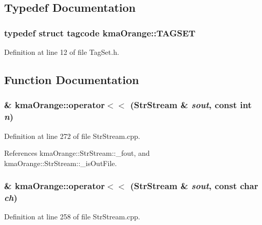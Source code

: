 \subsection{Typedef Documentation}
\hypertarget{namespacekmaOrange_230797a4305d0e6ffe336733f420995a}{
\subsubsection[{TAGSET}]{\setlength{\rightskip}{0pt plus 5cm}typedef struct {\bf tagcode} {\bf kmaOrange::TAGSET}}}
\label{namespacekmaOrange_230797a4305d0e6ffe336733f420995a}




Definition at line 12 of file TagSet.h.

\subsection{Function Documentation}
\hypertarget{namespacekmaOrange_008d16bca4a1401a4a101eef0ca283a1}{
\subsubsection[{operator$<$$<$}]{\& kmaOrange::operator$<$$<$ ({\bf StrStream} \& {\em sout}, \/  const int {\em n})}}
\label{namespacekmaOrange_008d16bca4a1401a4a101eef0ca283a1}




Definition at line 272 of file StrStream.cpp.

References kmaOrange::StrStream::\_\-fout, and kmaOrange::StrStream::\_\-isOutFile.\hypertarget{namespacekmaOrange_3ef646cb3fe8b1b3f864a03226c55706}{
\subsubsection[{operator$<$$<$}]{\& kmaOrange::operator$<$$<$ ({\bf StrStream} \& {\em sout}, \/  const char {\em ch})}}
\label{namespacekmaOrange_3ef646cb3fe8b1b3f864a03226c55706}




Definition at line 258 of file StrStream.cpp.

